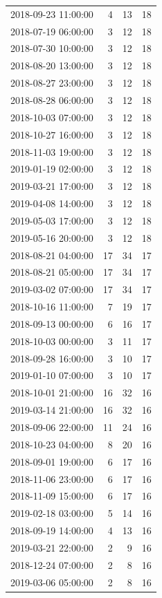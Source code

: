 \begin{tabular}{lrrr}
2018-09-23 11:00:00 & 4 & 13 & 18 \\
2018-07-19 06:00:00 & 3 & 12 & 18 \\
2018-07-30 10:00:00 & 3 & 12 & 18 \\
2018-08-20 13:00:00 & 3 & 12 & 18 \\
2018-08-27 23:00:00 & 3 & 12 & 18 \\
2018-08-28 06:00:00 & 3 & 12 & 18 \\
2018-10-03 07:00:00 & 3 & 12 & 18 \\
2018-10-27 16:00:00 & 3 & 12 & 18 \\
2018-11-03 19:00:00 & 3 & 12 & 18 \\
2019-01-19 02:00:00 & 3 & 12 & 18 \\
2019-03-21 17:00:00 & 3 & 12 & 18 \\
2019-04-08 14:00:00 & 3 & 12 & 18 \\
2019-05-03 17:00:00 & 3 & 12 & 18 \\
2019-05-16 20:00:00 & 3 & 12 & 18 \\
2018-08-21 04:00:00 & 17 & 34 & 17 \\
2018-08-21 05:00:00 & 17 & 34 & 17 \\
2019-03-02 07:00:00 & 17 & 34 & 17 \\
2018-10-16 11:00:00 & 7 & 19 & 17 \\
2018-09-13 00:00:00 & 6 & 16 & 17 \\
2018-10-03 00:00:00 & 3 & 11 & 17 \\
2018-09-28 16:00:00 & 3 & 10 & 17 \\
2019-01-10 07:00:00 & 3 & 10 & 17 \\
2018-10-01 21:00:00 & 16 & 32 & 16 \\
2019-03-14 21:00:00 & 16 & 32 & 16 \\
2018-09-06 22:00:00 & 11 & 24 & 16 \\
2018-10-23 04:00:00 & 8 & 20 & 16 \\
2018-09-01 19:00:00 & 6 & 17 & 16 \\
2018-11-06 23:00:00 & 6 & 17 & 16 \\
2018-11-09 15:00:00 & 6 & 17 & 16 \\
2019-02-18 03:00:00 & 5 & 14 & 16 \\
2018-09-19 14:00:00 & 4 & 13 & 16 \\
2019-03-21 22:00:00 & 2 & 9 & 16 \\
2018-12-24 07:00:00 & 2 & 8 & 16 \\
2019-03-06 05:00:00 & 2 & 8 & 16 \\

\end{tabular}
